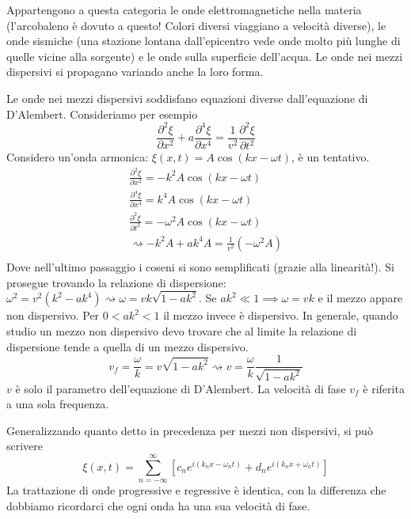 Appartengono a questa categoria le onde elettromagnetiche nella materia (l'arcobaleno è dovuto a questo! Colori diversi viaggiano a velocità diverse), le onde sismiche (una stazione lontana dall'epicentro vede onde molto più lunghe di quelle vicine alla sorgente) e le onde sulla superficie dell'acqua. Le onde nei mezzi dispersivi si propagano variando anche la loro forma.

\begin{eg}
	Le onde nei mezzi dispersivi soddisfano equazioni diverse dall'equazione di D'Alembert. Consideriamo per esempio
	\[
		\frac{\partial ^{2} \xi }{\partial x^{2} } + a \frac{\partial ^4 \xi }{\partial x^4}  = \frac{1}{v^{2} }\frac{\partial ^{2} \xi }{\partial t^{2} } 
	\]
	Considero un'onda armonica: \(\xi (x,t) = A \cos (kx - \omega t)\), è un tentativo.
	\begin{gather*}
		\frac{\partial ^{2} \xi }{\partial x^{2} } = - k^{2} A \cos (kx - \omega t)\\
		\frac{\partial ^4 \xi }{\partial x^4} = k^{4} A \cos (kx - \omega t)\\
		\frac{\partial ^{2} \xi }{\partial t^{2} } = - \omega ^2 A \cos (kx - \omega t)\\
		\rightsquigarrow - k^{2} A + a k^{4} A = \frac{1}{v^{2} }(- \omega ^2 A)\\ 
	\end{gather*}
	Dove nell'ultimo passaggio i coseni si sono semplificati (grazie alla linearità!). Si prosegue trovando la relazione di dispersione: \(\omega ^{2} = v ^{2} (k^{2} -ak^4) \rightsquigarrow \omega = vk\sqrt{1-ak^2} \). Se \(ak^{2} \ll 1 \implies \omega = vk\) e il mezzo appare non dispersivo. Per \(0<ak^{2} <1\) il mezzo invece è dispersivo. In generale, quando studio un mezzo non dispersivo devo trovare che al limite la relazione di dispersione tende a quella di un mezzo dispersivo.
	\[
		v_f = \frac{\omega }{k} = v\sqrt{1-ak^{2} } \rightsquigarrow v= \frac{\omega }{k}\frac{1}{\sqrt{1-ak^{2} } } 
	\]
	\(v\) è solo il parametro dell'equazione di D'Alembert. La velocità di fase \(v_f\) è riferita a una sola frequenza.
\end{eg}

Generalizzando quanto detto in precedenza per mezzi non dispersivi, si può scrivere
\[
	\xi (x,t) = \sum_{n=-\infty }^{\infty} [c_n e^{i(k_n x - \omega _n t)} + d_n e^{i(k_n x + \omega _n t)}]
\]
La trattazione di onde progressive e regressive è identica, con la differenza che dobbiamo ricordarci che ogni onda ha una sua velocità di fase.